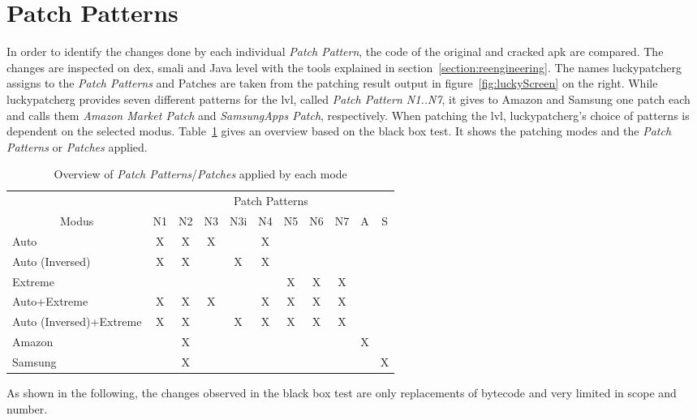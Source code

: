 \section{Patch Patterns} \label{section:luckypatcher-patterns}
In order to identify the changes done by each individual \textit{Patch Pattern}, the code of the original and cracked \gls{apk} are compared.
The changes are inspected on dex, smali and Java level with the tools explained in section~\ref{section:reengineering}.
\newline
The names \gls{luckypatcherg} assigns to the \textit{Patch Patterns} and Patches are taken from the patching result output in figure~\ref{fig:luckyScreen} on the right.
While \gls{luckypatcherg} provides seven different patterns for the \gls{lvl}, called \textit{Patch Pattern N1..N7}, it gives to Amazon and Samsung one patch each and calls them \textit{Amazon Market Patch} and \textit{SamsungApps Patch}, respectively.
\newline
When patching the \gls{lvl}, \gls{luckypatcherg}'s choice of patterns is dependent on the selected modus.
Table~\ref{table:patterns} gives an overview based on the black box test.
It shows the patching modes and the \textit{Patch Patterns} or \textit{Patches} applied.
\newline
\begin{table}[h]
\centering
\begin{tabular}{l|cccccccccc}
              & \multicolumn{10}{c}{Patch Patterns}      \\
\multicolumn{1}{c|}{Modus} & N1 & N2 & N3 & N3i & N4 & N5 & N6 & N7 & A & S \\ \hline
Auto            & X & X & X &   & X &  &  & && \\
Auto (Inversed)      & X & X &  & X  & X &  &  & && \\
Extreme          &  &  &  &   &  & X & X & X && \\
Auto+Extreme        & X & X & X &   & X & X & X & X && \\
Auto (Inversed)+Extreme  & X & X &  & X  & X & X & X &X &&\\
Amazon        &  & X&  &   &  &  &  & &X&\\
Samsung        &  &  X&  &   &  &  &  &  &&X
\end{tabular}
\caption{Overview of \textit{Patch Patterns}/\textit{Patches} applied by each mode}
\label{table:patterns}
\end{table}
As shown in the following, the changes observed in the black box test are only replacements of bytecode and very limited in scope and number.

